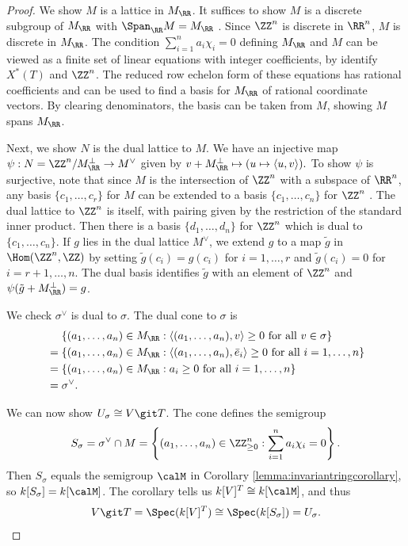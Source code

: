 \documentclass[12pt]{amsart}
\theoremstyle{plain}
\begin{document}
\begin{proof}
We show $M$ is a lattice in $M_\RR$.
It suffices to show $M$ is a discrete subgroup of $M_\RR$ with $\Span_\RR M = M_\RR$ \cite[\S 2.2]{Serre73}.
Since $\ZZ^n$ is discrete in $\RR^n$, $M$ is discrete in $M_\RR$.
The condition $\sum_{i=1}^n a_i \chi_i = 0$ defining $M_\RR$ and $M$ can be viewed as a finite set of linear equations with integer coefficients, by identify $X^*(T)$ and $\ZZ^n$.
The reduced row echelon form of these equations has rational coefficients and can be used to find a basis for $M_\RR$ of rational coordinate vectors.
By clearing denominators, the basis can be taken from $M$, showing $M$ spans $M_\RR$.

Next, we show $N$ is the dual lattice to $M$.
We have an injective map $\psi : N=\ZZ^n/M_\RR^\perp \to M^\vee$ given by $v + M_\RR^\perp \mapsto (u \mapsto \langle u, v\rangle).$
To show $\psi$ is surjective, note that since $M$ is the intersection of $\ZZ^n$ with a subspace of $\RR^n$, any basis $\{c_1, \ldots, c_r\}$ for $M$ can be extended to a basis $\{c_1, \ldots, c_n\}$ for $\ZZ^n$ \cite[I.2, Corollary 3]{Cassels97}.
The dual lattice to $\ZZ^n$ is itself, with pairing given by the restriction of the standard inner product. 
Then there is a basis $\{d_1, \ldots, d_n\}$ for $\ZZ^n$ which is dual to $\{c_1, \ldots, c_n\}$.
If $g$ lies in the dual lattice $M^\vee$, we extend $g$ to a map $\tilde g$ in $\Hom(\ZZ^n, \ZZ)$ by setting $\tilde g(c_i) = g(c_i)$ for $i = 1, \ldots, r$ and $\tilde g(c_i) = 0$ for $i=r+1,\ldots, n$.
The dual basis identifies $\tilde g$ with an element of $\ZZ^n$ and $\psi(\tilde g +M_\RR^\perp) = g$.

We check $\sigma^\vee$ is dual to $\sigma$.
The dual cone to $\sigma$ is
\begin{align*}
	&\quad \, \left\{(a_1, \ldots, a_n) \in M_\RR : \langle (a_1, \ldots, a_n), v \rangle \ge 0 \text{ for all } v \in \sigma\right\} \\
	&= \left\{(a_1, \ldots, a_n) \in M_\RR : \langle (a_1, \ldots, a_n), \bar e_i \rangle \ge 0 \text{ for all } i=1, \ldots, n \right\} \\
	&= \left\{(a_1, \ldots, a_n) \in M_\RR : a_i \ge 0 \text{ for all } i=1, \ldots, n \right\} \\
	&= \sigma^\vee.
\end{align*}

We can now show $U_\sigma \cong V \git T$.
The cone defines the semigroup
$$S_\sigma = \sigma^\vee \cap M = \left\{(a_1, \ldots, a_n) \in \ZZ_{\ge 0}^n : \sum_{i=1}^n a_i \chi_i = 0 \right\}.$$
Then $S_\sigma$ equals the semigroup $\calM$ in Corollary \ref{lemma:invariantringcorollary}, so $k[S_\sigma] = k[\calM]$.
The corollary tells us $k[V]^T \cong k[\calM]$, and thus
$$V \git T = \Spec(k[V]^T) \cong \Spec(k[S_\sigma]) = U_\sigma.$$


\end{proof}
\end{document}
